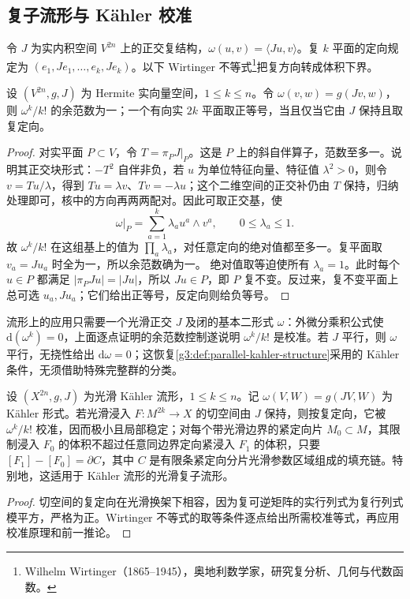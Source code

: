 \subsection{复子流形与 Kähler 校准}
\label{g3:subsec:1904:04}
令 \(J\) 为实内积空间 \(V^{2n}\) 上的正交复结构，\(\omega(u,v)=\langle Ju,v\rangle\)。复 \(k\) 平面的定向规定为
\((e_1,Je_1,\ldots,e_k,Je_k)\)。以下 Wirtinger 不等式\footnote{Wilhelm Wirtinger（1865--1945），奥地利数学家，研究复分析、几何与代数函数。}把复方向转成体积下界。

\begin{proposition}\label{g3:prop:wirtinger-calibration}
	设 \((V^{2n},g,J)\) 为 Hermite 实向量空间，\(1\le k\le n\)。令 \(\omega(v,w)=g(Jv,w)\)，则 \(\omega^k/k!\) 的余范数为一；一个有向实 \(2k\) 平面取正等号，当且仅当它由 \(J\) 保持且取复定向。
\end{proposition}
\begin{proof}
	对实平面 \(P\subset V\)，令 \(T=\pi_PJ|_P\)。这是 \(P\) 上的斜自伴算子，范数至多一。说明其正交块形式：\(-T^2\) 自伴非负，若 \(u\) 为单位特征向量、特征值 \(\lambda^2>0\)，则令 \(v=Tu/\lambda\)，得到 \(Tu=\lambda v\)、\(Tv=-\lambda u\)；这个二维空间的正交补仍由 \(T\) 保持，归纳处理即可，核中的方向再两两配对。因此可取正交基，使
	\[
		\omega|_P=\sum_{a=1}^k\lambda_a u^a\wedge v^a,
		\qquad 0\le\lambda_a\le1.
	\]
	故 \(\omega^k/k!\) 在这组基上的值为 \(\prod_a\lambda_a\)，对任意定向的绝对值都至多一。复平面取 \(v_a=Ju_a\) 时全为一，所以余范数确为一。
	绝对值取等迫使所有 \(\lambda_a=1\)。此时每个 \(u\in P\) 都满足 \(|\pi_PJu|=|Ju|\)，所以 \(Ju\in P\)，即 \(P\) 复不变。反过来，复不变平面上总可选 \(u_a,Ju_a\)；它们给出正等号，反定向则给负等号。
\end{proof}

流形上的应用只需要一个光滑正交 \(J\) 及闭的基本二形式 \(\omega\)：外微分乘积公式使 \(\mathrm d(\omega^k)=0\)，上面逐点证明的余范数控制遂说明 \(\omega^k/k!\) 是校准。若 \(J\) 平行，则 \(\omega\) 平行，无挠性给出 \(\mathrm d\omega=0\)；这恢复\cref{g3:def:parallel-kahler-structure}采用的 Kähler 条件，无须借助特殊完整群的分类。

\begin{corollary}\label{g3:cor:complex-submanifold-calibrated}
	设 \((X^{2n},g,J)\) 为光滑 Kähler 流形，\(1\le k\le n\)。记 \(\omega(V,W)=g(JV,W)\) 为 Kähler 形式。若光滑浸入 \(F:M^{2k}\to X\) 的切空间由 \(J\) 保持，则按复定向，它被 \(\omega^k/k!\) 校准，因而极小且局部稳定；对每个带光滑边界的紧定向片 \(M_0\subset M\)，其限制浸入 \(F_0\) 的体积不超过任意同边界定向紧浸入 \(F_1\) 的体积，只要 \([F_1]-[F_0]=\partial C\)，其中 \(C\) 是有限条紧定向分片光滑参数区域组成的填充链。特别地，这适用于 Kähler 流形的光滑复子流形。
\end{corollary}
\begin{proof}
	切空间的复定向在光滑换架下相容，因为复可逆矩阵的实行列式为复行列式模平方，严格为正。Wirtinger 不等式的取等条件逐点给出所需校准等式，再应用校准原理和前一推论。
\end{proof}

